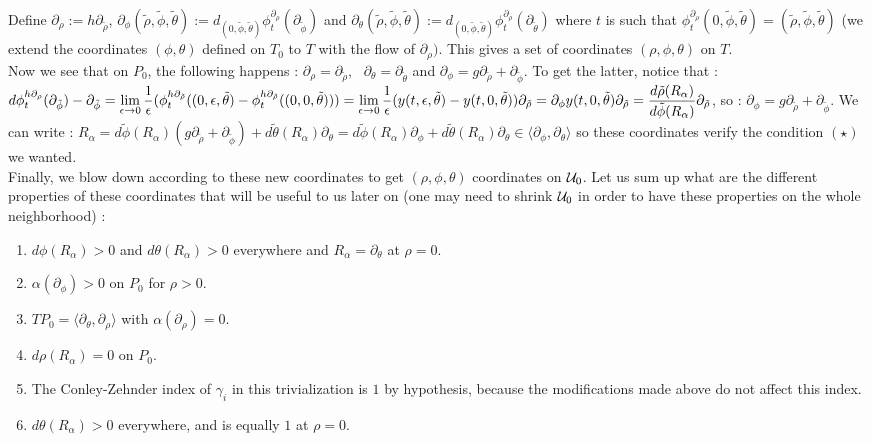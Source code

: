 \documentclass[../main.tex]{subfiles}
\begin{document}
Define $\partial_\rho := h\partial_{\tilde{\rho}}$, $\partial_\phi(\tilde{\rho},\tilde{\phi},\tilde{\theta}) := d_{(0,\tilde{\phi},\tilde{\theta})}\phi_t^{\partial_\rho}(\partial_{\tilde{\phi}})$ and $\partial_\theta(\tilde{\rho},\tilde{\phi},\tilde{\theta}) := d_{(0,\tilde{\phi},\tilde{\theta})}\phi_t^{\partial_\rho}(\partial_{\tilde{\theta}})$ where $t$ is such that $\phi_t^{\partial_\rho}(0,\tilde{\phi},\tilde{\theta}) = (\tilde{\rho},\tilde{\phi},\tilde{\theta})$ (we extend the coordinates $(\phi,\theta)$ defined on $T_0$ to $T$ with the flow of $\partial_\rho)$. This gives a set of coordinates $(\rho,\phi,\theta)$ on $T$.\\

Now we see that on $P_0$, the following happens : $\partial_\rho = \partial_{\tilde{\rho}},\text{ } \partial_\theta = \partial_{\tilde{\theta}}$ and $\partial_\phi = g\partial_{\tilde{\rho}} +  \partial_{\tilde{\phi}} $. To get the latter, notice that : $d\phi^{h\partial_\rho}_t(\partial_{\tilde{\phi}}) - \partial_{\tilde{\phi}}= \displaystyle\lim_{\epsilon\rightarrow0}\frac{1}{\epsilon}(\phi_t^{h\partial_{\tilde{\rho}}}((0,\epsilon,\tilde{\theta})-\phi_t^{h\partial_{\tilde{\rho}}}((0,0,\tilde{\theta}))) = \displaystyle\lim_{\epsilon\rightarrow0}\frac{1}{\epsilon}(y(t,\epsilon,\tilde{\theta}) - y(t,0,\tilde{\theta}))\partial_{\tilde{\rho}} = \partial_\phi y(t,0,\tilde{\theta})\partial_{\tilde{\rho}} = \frac{d\tilde{\rho}(R_\alpha)}{d\tilde{\phi}(R_\alpha)}\partial_{\tilde{\rho}}$, so : $\partial_\phi = g\partial_{\tilde{\rho}} + \partial_{\tilde{\phi}}$. We can write : $R_\alpha = d\tilde{\phi}(R_\alpha)(g\partial_{\tilde{\rho}} + \partial_{\tilde{\phi}}) + d\tilde{\theta}(R_\alpha)\partial_\theta = d\tilde{\phi}(R_\alpha)\partial_\phi + d\tilde{\theta}(R_\alpha)\partial_\theta \in \langle\partial_\phi,\partial_\theta\rangle$ so these coordinates verify the condition $(\star)$ we wanted.\\

Finally, we blow down according to these new coordinates to get $(\rho,\phi,\theta)$ coordinates on $\mathcal{U}_0$. Let us sum up what are the different properties of these coordinates that will be useful to us later on (one may need to shrink $\mathcal{U}_0$ in order to have these properties on the whole neighborhood) : 
\begin{enumerate}
    \item $d\phi(R_\alpha) > 0$ and $d\theta(R_\alpha) > 0$ everywhere and $R_\alpha = \partial_\theta$ at $\rho = 0$.
    \item $\alpha(\partial_\phi) > 0$ on $P_0$ for $\rho > 0$.
    \item $TP_0 = \langle \partial_\theta,\partial_\rho\rangle$ with $\alpha(\partial_\rho) = 0$.
    \item $d\rho(R_\alpha) = 0$ on $P_0$.
    \item The Conley-Zehnder index of $\gamma_i$ in this trivialization is $1$ by hypothesis, because the modifications made above do not affect this index. 
    \item $d\theta(R_\alpha) > 0$ everywhere, and is equally $1$ at $\rho = 0$.
\end{enumerate}
\end{document}
